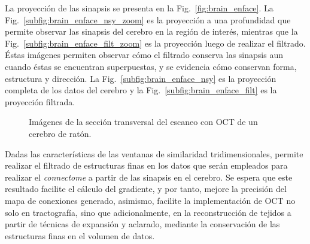 La proyección \enface de las sinapsis se presenta en la Fig.~\ref{fig:brain_enface}. La Fig.~\ref{subfig:brain_enface_nsy_zoom} es la proyección a una profundidad que permite observar las sinapsis del cerebro en la región de interés, mientras que la Fig.~\ref{subfig:brain_enface_filt_zoom} es la proyección luego de realizar el filtrado. Éstas imágenes permiten observar cómo el filtrado conserva las sinapsis aun cuando éstas se encuentran superpuestas, y se evidencia cómo conservan forma, estructura y dirección. La Fig.~\ref{subfig:brain_enface_nsy} es la proyección \enface completa de los datos del cerebro y la Fig.~\ref{subfig:brain_enface_filt} es la proyección filtrada.


\begin{figure}[ht!]
	\centering
	\caption[Sección transversal del cerebro de ratón]{Imágenes de la sección transversal del escaneo con OCT de un cerebro de ratón.}
	\label{fig:brain}
\end{figure}

Dadas las características de las ventanas de similaridad tridimensionales, \nlmeansOCT permite realizar el filtrado de estructuras finas en los datos que serán empleados para realizar el \emph{connectome} a partir de las sinapsis en el cerebro. Se espera que este resultado facilite el cálculo del gradiente, y por tanto, mejore la precisión del mapa de conexiones generado, asimismo, facilite la implementación de OCT no solo en tractografía, sino que adicionalmente, en la reconstrucción de tejidos a partir de técnicas de expansión y aclarado, mediante la conservación de las estructuras finas en el volumen de datos.

